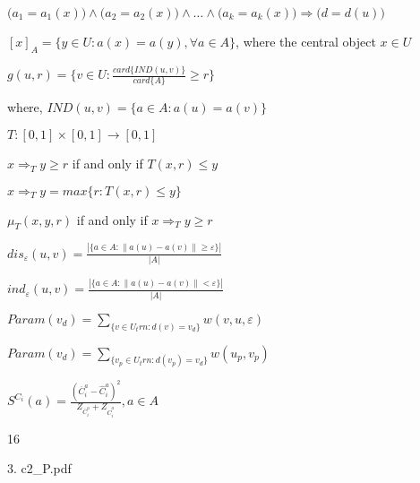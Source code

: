\documentclass{article}
\begin{document}
\begin{math}
\big( a_1=a_1(x)\big) \wedge \big( a_2=a_2(x)\big) \wedge \dots \wedge \big( a_k=a_k(x)\big) \Rightarrow \big( d=d(u) \big)
\end{math}

$[x]_A=\{y \in U:a(x)=a(y),\forall a \in A \}$, where the central object $x \in U$

$g(u,r)=\{v \in U:\frac{card\{IND(u,v)\}}{card\{A\}} \geq r \}$

where, $IND(u,v)=\{a \in A:a(u)=a(v)\}$

$T:[0,1]\times [0,1] \rightarrow [0,1]$

$x \Rightarrow_T y\geq r$ if and only if $T(x,r) \leq y$

$x \Rightarrow_T y=max\{r:T(x,r) \leq y\}$

$\mu_T(x,y,r)$ if and only if $x \Rightarrow_T y \geq r$

$dis_\varepsilon (u,v)=\frac{| \{a \in A :\| a(u)-a(v)\| \geq \varepsilon \} | }{|A| }$

$ind_\varepsilon (u,v)=\frac{| \{a \in A :\| a(u)-a(v)\| < \varepsilon \} | }{|A| }$

$Param(v_d)=\sum_{\{v \in U_trn :d(v)=v_d\} }{w(v,u,\varepsilon)}$

$Param(v_d)=\sum_{\{v_p \in U_trn :d(v_p)=v_d\} }{w(u_p,v_p)}$

$S^{C_i}(a)=\frac{(\overline{C}_{i}^{a} - \widehat{C}_{i}^{a})^{2}}{Z_{\overline{C}_{i}^{a}} + Z_{\widehat{C}_{i}^{a}}}, a \in A$

16

3. c2\_P.pdf
\begin{math}
\end{math}
\begin{math}
\end{math}
\begin{math}
\end{math}
\begin{math}
\end{math}
\begin{math}
\end{math}
\begin{math}
\end{math}
\end{document}
